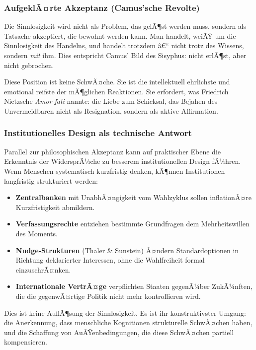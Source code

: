 ﻿\documentclass[12pt, a4paper]{article}
\begin{document}
\subsubsection{AufgeklÃ¤rte Akzeptanz (Camus'sche Revolte)}

Die Sinnlosigkeit wird nicht als Problem, das gelÃ¶st werden muss, sondern als
Tatsache akzeptiert, die bewohnt werden kann. Man handelt, weiÃŸ um die
Sinnlosigkeit des Handelns, und handelt trotzdem â€“ nicht trotz des Wissens,
sondern \emph{mit} ihm. Dies entspricht Camus' Bild des Sisyphus: nicht
erlÃ¶st, aber nicht gebrochen.

Diese Position ist keine SchwÃ¤che. Sie ist die intellektuell ehrlichste und
emotional reifste der mÃ¶glichen Reaktionen. Sie erfordert, was Friedrich
Nietzsche \emph{Amor fati} nannte: die Liebe zum Schicksal, das Bejahen des
Unvermeidbaren nicht als Resignation, sondern als aktive Affirmation.

\subsubsection{Institutionelles Design als technische Antwort}

Parallel zur philosophischen Akzeptanz kann auf praktischer Ebene die
Erkenntnis der WidersprÃ¼che zu besserem institutionellen Design fÃ¼hren.
Wenn Menschen systematisch kurzfristig denken, kÃ¶nnen Institutionen
langfristig strukturiert werden:

\begin{itemize}
  \item \textbf{Zentralbanken} mit UnabhÃ¤ngigkeit vom Wahlzyklus sollen
    inflationÃ¤re Kurzfristigkeit abmildern.
  \item \textbf{Verfassungsrechte} entziehen bestimmte Grundfragen dem
    Mehrheitswillen des Moments.
  \item \textbf{Nudge-Strukturen} (Thaler \& Sunstein) Ã¤ndern Standardoptionen
    in Richtung deklarierter Interessen, ohne die Wahlfreiheit formal einzuschrÃ¤nken.
  \item \textbf{Internationale VertrÃ¤ge} verpflichten Staaten gegenÃ¼ber
    ZukÃ¼nften, die die gegenwÃ¤rtige Politik nicht mehr kontrollieren wird.
\end{itemize}

Dies ist keine AuflÃ¶sung der Sinnlosigkeit. Es ist ihr konstruktivster Umgang:
die Anerkennung, dass menschliche Kognitionen strukturelle SchwÃ¤chen haben,
und die Schaffung von AuÃŸenbedingungen, die diese SchwÃ¤chen partiell kompensieren.
\end{document}
